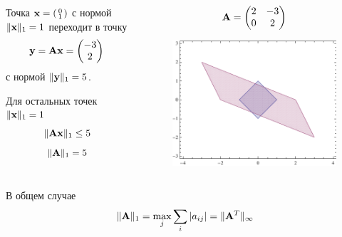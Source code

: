 \documentclass[professionalfonts,compress,unicode]{beamer}
\begin{document}
{
\begin{columns}[T]
\begin{column}{0.6\textwidth}
Точка 
${\bf x} = \left(\begin{smallmatrix}
	0\\1
\end{smallmatrix}\right)$
 с нормой $\|{\bf x}\|_1 = 1$ переходит в точку $${\bf y} = {\bf A}{\bf x} = \begin{pmatrix}
	-3\\2
\end{pmatrix}$$
 с нормой $\|{\bf y}\|_1 = 5$. 

Для остальных точек $\|{\bf x}\|_1 = 1$ 
$$\|{\bf A}{\bf x}\|_1 \leq 5$$
$$
\|{\bf A}\|_1 = 5
$$
\end{column}

\begin{column}{0.4\textwidth}
$$
{\bf A} = \begin{pmatrix}
	2&-3\\
	0&2
\end{pmatrix}
$$
\begin{figure}%
\includegraphics[width=\columnwidth]{l1.pdf}%
\end{figure}
\end{column}
\end{columns}
\begin{block}{В общем случае}
$$
\|{\bf A}\|_1 = \max_j \sum_i |a_{ij}| = \|{\bf A}^T\|_\infty
$$
\end{block}
}
\end{document}
